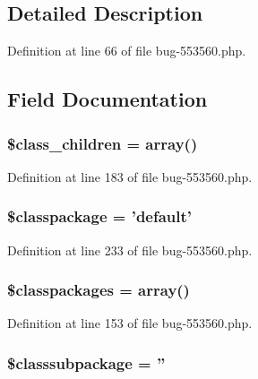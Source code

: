\subsection{\-Detailed \-Description}


\-Definition at line 66 of file bug-\/553560.\-php.



\subsection{\-Field \-Documentation}
\hypertarget{classi_new_render_a6b5678398e9312d863f634e68cc0c99c}{
\subsubsection[{\$class\-\_\-children}]{\setlength{\rightskip}{0pt plus 5cm}\$class\-\_\-children = array()}}\label{classi_new_render_a6b5678398e9312d863f634e68cc0c99c}


\-Definition at line 183 of file bug-\/553560.\-php.

\hypertarget{classi_new_render_ab1034a49bae93ff3279b56372ff43155}{
\subsubsection[{\$classpackage}]{\setlength{\rightskip}{0pt plus 5cm}\$classpackage = 'default'}}\label{classi_new_render_ab1034a49bae93ff3279b56372ff43155}


\-Definition at line 233 of file bug-\/553560.\-php.

\hypertarget{classi_new_render_a09bcc1887501550f7572bb4e997ed6cd}{
\subsubsection[{\$classpackages}]{\setlength{\rightskip}{0pt plus 5cm}\$classpackages = array()}}\label{classi_new_render_a09bcc1887501550f7572bb4e997ed6cd}


\-Definition at line 153 of file bug-\/553560.\-php.

\hypertarget{classi_new_render_a5a625401e0cae21858cba45b196611bb}{
\subsubsection[{\$classsubpackage}]{\setlength{\rightskip}{0pt plus 5cm}\$classsubpackage = ''}}\label{classi_new_render_a5a625401e0cae21858cba45b196611bb}


